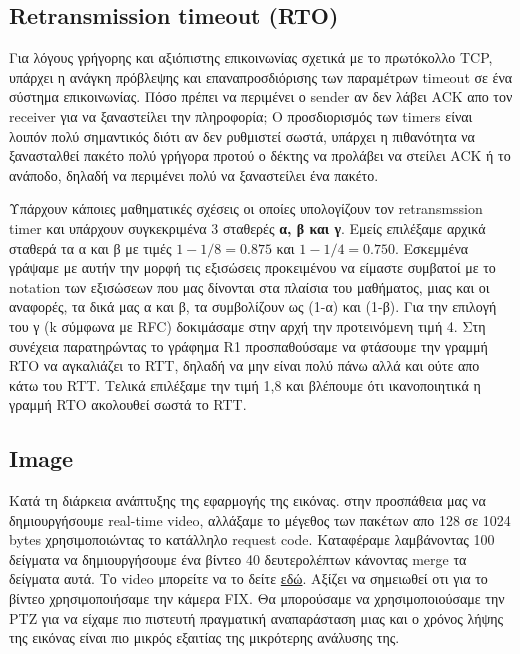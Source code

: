 \documentclass[hidelinks, 12pt, a4paper]{article}
\begin{document}
\subsection{Retransmission timeout (RTO)}


Για λόγους γρήγορης και αξιόπιστης επικοινωνίας σχετικά με το πρωτόκολλο TCP, υπάρχει η ανάγκη πρόβλεψης και επαναπροσδιόρισης των παραμέτρων timeout σε ένα σύστημα επικοινωνίας. Πόσο πρέπει να περιμένει ο sender αν δεν λάβει  ACK απο τον receiver για να ξαναστείλει την πληροφορία; Ο προσδιορισμός των timers είναι λοιπόν πολύ σημαντικός διότι αν δεν ρυθμιστεί σωστά, υπάρχει η πιθανότητα να ξανασταλθεί πακέτο πολύ γρήγορα προτού ο δέκτης να προλάβει να στείλει ACΚ ή το ανάποδο, δηλαδή να περιμένει πολύ να ξαναστείλει ένα πακέτο\cite{gfg_rto, saminir}. 

Υπάρχουν κάποιες μαθηματικές σχέσεις οι οποίες υπολογίζουν τον retransmssion timer και υπάρχουν συγκεκριμένα 3 σταθερές \textbf{α, β και γ}. Εμείς επιλέξαμε αρχικά σταθερά τα α και β με τιμές $1 - 1/8 = 0.875$ και $1 - 1/4 = 0.750$. Εσκεμμένα γράψαμε με αυτήν την μορφή τις εξισώσεις προκειμένου να είμαστε συμβατοί με το notation των εξισώσεων που μας δίνονται στα πλαίσια του μαθήματος, μιας και οι αναφορές\cite{rfc}, τα δικά μας α και β, τα συμβολίζουν ως (1-α) και (1-β). Για την επιλογή του γ (k σύμφωνα με RFC) δοκιμάσαμε στην αρχή την προτεινόμενη τιμή 4. Στη συνέχεια παρατηρώντας το γράφημα R1 προσπαθούσαμε να φτάσουμε την γραμμή RTO να αγκαλιάζει το RTT, δηλαδή να μην είναι πολύ πάνω αλλά και ούτε απο κάτω του RTT. Τελικά επιλέξαμε την τιμή 1,8 και βλέπουμε ότι ικανοποιητικά η γραμμή RTO ακολουθεί σωστά το RTT.



\subsection{Image}

Κατά τη διάρκεια ανάπτυξης της εφαρμογής της εικόνας. στην προσπάθεια μας να δημιουργήσουμε real-time video, αλλάξαμε το μέγεθος των πακέτων απο 128 σε 1024 bytes χρησιμοποιώντας το κατάλληλο request code. Καταφέραμε λαμβάνοντας 100 δείγματα να δημιουργήσουμε ένα βίντεο 40 δευτερολέπτων κάνοντας merge τα δείγματα αυτά. Το video μπορείτε να το δείτε \href{https://drive.google.com/file/d/1yfwckvGBr8YteigF3ainMJMXwLOzjZ9u/view?usp=sharing}{εδώ}. Αξίζει να σημειωθεί οτι για το βίντεο χρησιμοποιήσαμε την κάμερα FIX. Θα μπορούσαμε να χρησιμοποιούσαμε την PTZ για να είχαμε πιο πιστευτή πραγματική αναπαράσταση μιας και ο χρόνος λήψης της εικόνας είναι πιο μικρός εξαιτίας της μικρότερης ανάλυσης της.
\end{document}

